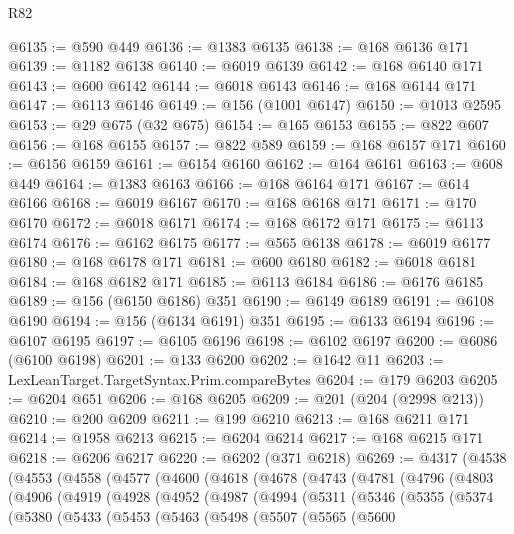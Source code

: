 \begin{lexlean}{R82}
\begin{coremodule}
@6135 := @590 @449
@6136 := @1383 @6135
@6138 := @168 @6136 @171
@6139 := @1182 @6138
@6140 := @6019 @6139
@6142 := @168 @6140 @171
@6143 := @600 @6142
@6144 := @6018 @6143
@6146 := @168 @6144 @171
@6147 := @6113 @6146
@6149 := @156 (@1001 @6147)
@6150 := @1013 @2595
@6153 := @29 @675 (@32 @675)
@6154 := @165 @6153
@6155 := @822 @607
@6156 := @168 @6155
@6157 := @822 @589
@6159 := @168 @6157 @171
@6160 := @6156 @6159
@6161 := @6154 @6160
@6162 := @164 @6161
@6163 := @608 @449
@6164 := @1383 @6163
@6166 := @168 @6164 @171
@6167 := @614 @6166
@6168 := @6019 @6167
@6170 := @168 @6168 @171
@6171 := @170 @6170
@6172 := @6018 @6171
@6174 := @168 @6172 @171
@6175 := @6113 @6174
@6176 := @6162 @6175
@6177 := @565 @6138
@6178 := @6019 @6177
@6180 := @168 @6178 @171
@6181 := @600 @6180
@6182 := @6018 @6181
@6184 := @168 @6182 @171
@6185 := @6113 @6184
@6186 := @6176 @6185
@6189 := @156 (@6150 @6186) @351
@6190 := @6149 @6189
@6191 := @6108 @6190
@6194 := @156 (@6134 @6191) @351
@6195 := @6133 @6194
@6196 := @6107 @6195
@6197 := @6105 @6196
@6198 := @6102 @6197
@6200 := @6086 (@6100 @6198)
@6201 := @133 @6200
@6202 := @1642 @11
@6203 := LexLeanTarget.TargetSyntax.Prim.compareBytes
@6204 := @179 @6203
@6205 := @6204 @651
@6206 := @168 @6205
@6209 := @201 (@204 (@2998 @213))
@6210 := @200 @6209
@6211 := @199 @6210
@6213 := @168 @6211 @171
@6214 := @1958 @6213
@6215 := @6204 @6214
@6217 := @168 @6215 @171
@6218 := @6206 @6217
@6220 := @6202 (@371 @6218)
@6269 := @4317
    (@4538
      (@4553
        (@4558
          (@4577
            (@4600
              (@4618
                (@4678
                  (@4743
                    (@4781
                      (@4796
                        (@4803
                          (@4906
                            (@4919
                              (@4928
                                (@4952
                                  (@4987
                                    (@4994
                                      (@5311
                                        (@5346
                                          (@5355
                                            (@5374
                                              (@5380
                                                (@5433
                                                  (@5453
                                                    (@5463
                                                      (@5498
                                                        (@5507
                                                          (@5565
                                                            (@5600

\end{coremodule}
\end{lexlean}
